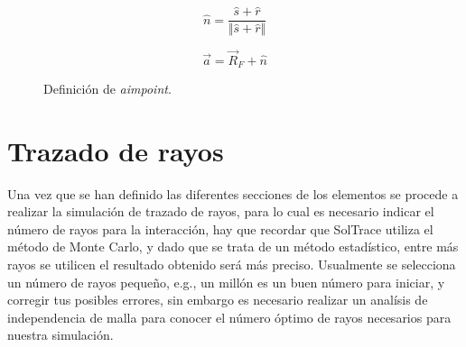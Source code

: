 \documentclass[12pt, spanish]{article}
\theoremstyle{problemstyle}
\begin{document}
\begin{equation} \label{ec:n}
  \hat n = \dfrac{\hat s + \hat r}{\Vert \hat s + \hat r \Vert}
\end{equation}

\begin{equation} \label{ec:aimpoint}
  \vec a = \vec R_F + \hat n 
\end{equation}



\begin{figure}[h!]
  \centering
  \caption{\label{fig:aimpoint} Definición de \emph{aimpoint}.}
\end{figure}


\section{Trazado de rayos}
\label{sec:trazado}

Una vez que se han definido las diferentes secciones de los elementos se procede a realizar la simulación de trazado de rayos, para lo cual es necesario indicar el número de rayos para la interacción, hay que recordar que SolTrace utiliza el método de Monte Carlo, y dado que se trata de un método estadístico, entre más rayos se utilicen el resultado obtenido será más preciso. Usualmente se selecciona un número de rayos pequeño, e.g., un millón es un buen número para iniciar, y corregir tus posibles errores, sin embargo es necesario realizar un analísis de independencia de malla para conocer el número óptimo de rayos necesarios para nuestra simulación.
\end{document}
